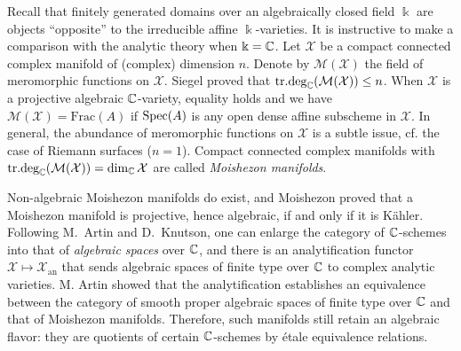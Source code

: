 \begin{remark}
	Recall that finitely generated domains over an algebraically closed field $\Bbbk$ are objects ``opposite'' to the irreducible affine $\Bbbk$-varieties. It is instructive to make a comparison with the analytic theory when $\Bbbk=\mathbb{C}$. Let $\mathcal{X}$ be a compact connected complex manifold of (complex) dimension $n$. Denote by $\mathcal{M}(\mathcal{X})$ the field of meromorphic functions on $\mathcal{X}$. Siegel proved that $\text{tr.deg}_{\mathbb{C}}(\mathcal{M}(\mathcal{X})) \leq n$. When $\mathcal{X}$ is a projective algebraic $\mathbb{C}$-variety, equality holds and we have $\mathcal{M}(\mathcal{X}) = \text{Frac}(A)$ if $\operatorname{Spec}(A)$ is any open dense affine subscheme in $\mathcal{X}$. In general, the abundance of meromorphic functions on $\mathcal{X}$ is a subtle issue, cf. the case of Riemann surfaces ($n=1$). Compact connected complex manifolds with $\text{tr.deg}_{\mathbb{C}}(\mathcal{M}(\mathcal{X})) = \dim_{\mathbb{C}} \mathcal{X}$ are called \emph{Moishezon manifolds}.
	
	Non-algebraic Moishezon manifolds do exist, and Moishezon proved that a Moishezon manifold is projective, hence algebraic, if and only if it is Kähler. Following M.\ Artin and D.\ Knutson, one can enlarge the category of $\mathbb{C}$-schemes into that of \emph{algebraic spaces} over $\mathbb{C}$, and there is an analytification functor $\mathcal{X} \mapsto \mathcal{X}_{\text{an}}$ that sends algebraic spaces of finite type over $\mathbb{C}$ to complex analytic varieties. M. Artin \cite[\S 7]{Ar70} showed that the analytification establishes an equivalence between the category of smooth proper algebraic spaces of finite type over $\mathbb{C}$ and that of Moishezon manifolds. Therefore, such manifolds still retain an algebraic flavor: they are quotients of certain $\mathbb{C}$-schemes by étale equivalence relations.
\end{remark}
